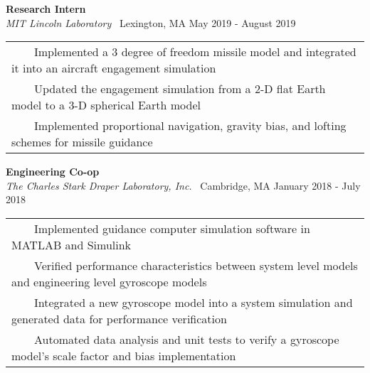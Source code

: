 \documentclass[overlapped, 11pt]{res}
\newcommand{\tabitem}{~~\textbullet~~}
\begin{document}
\begin{resume}
\begin{itemize}
            \textbf{Research Intern}\\
            \emph{MIT Lincoln Laboratory} \textbar 
                \ Lexington, MA \hfill May 2019 - August 2019
            \begin{tabular}{l}
                \tabitem Implemented a 3 degree of freedom missile model and integrated it into an aircraft engagement simulation \\
                \tabitem Updated the engagement simulation from a 2-D flat Earth model to a 3-D spherical Earth model \\
                \tabitem Implemented proportional navigation, gravity bias, and lofting schemes for missile guidance \\
           \end{tabular}

            
            \vspace{0.25em}
            \textbf{Engineering Co-op}\\
            \emph{The Charles Stark Draper Laboratory, Inc.} \textbar 
                \ Cambridge, MA \hfill January 2018 - July 2018
            \begin{tabular}{l}
                \tabitem Implemented guidance computer simulation software in MATLAB and Simulink \\
                \tabitem Verified performance characteristics between system level models and engineering level gyroscope models \\
                \tabitem Integrated a new gyroscope model into a system simulation and generated data for performance verification \\
                \tabitem Automated data analysis and unit tests to verify a gyroscope model's scale factor and bias implementation \\
            \end{tabular}


\end{itemize}
\end{resume}
\end{document}
